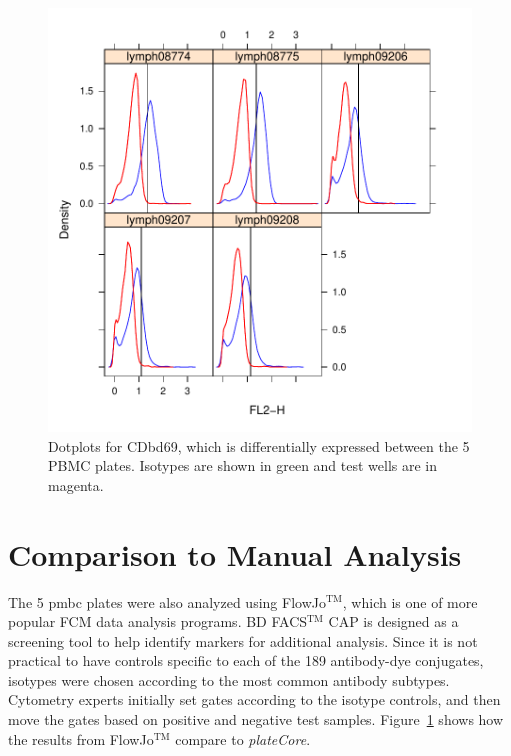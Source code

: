 \documentclass[12pt]{article}
\newcommand{\Rpackage}[1]{{\textit{#1}}}
\begin{document}
\begin{figure}
\centering
\includegraphics{outline-pbmcCDbd69}
\caption{Dotplots for CDbd69, which is differentially expressed between the 5 PBMC plates. Isotypes are shown in green and
test wells are in magenta.}
\label{fig:pbmcCDbd69}
\end{figure}

\clearpage
\section{Comparison to Manual Analysis}

The 5 pmbc plates were also analyzed using FlowJo$^{\text{TM}}$, which is one of more popular FCM data analysis programs.
BD FACS$^{\text{TM}}$ CAP is designed as a screening tool to help identify markers for additional analysis. Since it is 
not practical to have controls specific to each of the 189 antibody-dye conjugates, isotypes were chosen according to the
most common antibody subtypes. Cytometry experts initially set gates according to the isotype controls, and then move the
gates based on positive and negative test samples. Figure~\ref{} shows how the results from FlowJo$^{\text{TM}}$ compare to \Rpackage{plateCore}.
\end{document}
